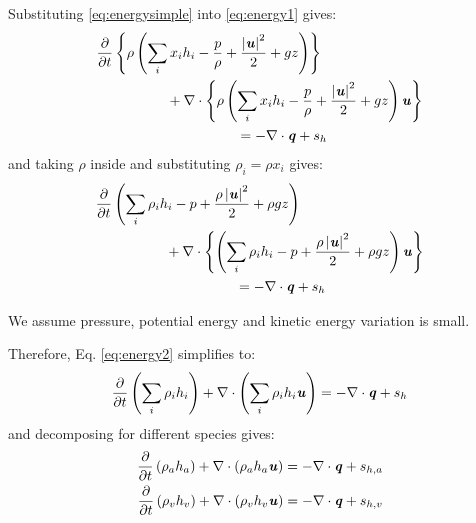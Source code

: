 Substituting \ref{eq:energysimple} into \ref{eq:energy1} gives:
\begin{equation}
\begin{split}
&\frac{\partial }{\partial t} \left\{\rho \left( \sum_i x_i h_i  - \frac{p}{\rho} + \frac{\left| \mvec{u} \right|^2}{2} + gz  \right) \right\}\\
& \hspace{5em} + \nabla  \cdot \left\{ \rho \left(   \sum_i x_i h_i  - \frac{p}{\rho} + \frac{\left| \mvec{u} \right|^2}{2} + gz  \right) \mvec{u} \right\} \\
& \hspace{10em}  =  - \nabla  \cdot \mvec{q} + s_h
\end{split}
\end{equation}
and taking $\rho$ inside and substituting $\rho_i = \rho x_i $ gives:
\begin{equation}
\begin{split}
&\frac{\partial }{\partial t} \left( \sum_i \rho_i h_i  - p + \frac{\rho \left| \mvec{u} \right|^2}{2} + \rho gz  \right) \\
& \hspace{5em} + \nabla  \cdot \left\{ \left(   \sum_i \rho_i h_i  - p + \frac{\rho \left| \mvec{u} \right|^2}{2} + \rho gz  \right) \mvec{u} \right\} \\
& \hspace{10em} =  - \nabla  \cdot \mvec{q} + s_h
\end{split}
\label{eq:energy2}
\end{equation}

\begin{assumption}
	We assume pressure, potential energy and kinetic energy variation is small. 
\end{assumption}	

Therefore, Eq. \ref{eq:energy2} simplifies to:
\begin{equation}
\frac{\partial }{\partial t} \left( \sum_i \rho_i h_i \right) +   \nabla  \cdot \left( \sum_i \rho_i h_i \textbf{\textit{u}}\right) =  - \nabla  \cdot \textbf{\textit{q}} + s_h
\end{equation}
and decomposing for different species gives:
\begin{align}
	\frac{\partial }{\partial t} \left( \rho_a h_a \right) +   \nabla  \cdot \left( \rho_a h_a \textbf{\textit{u}}\right) =  - \nabla  \cdot \textbf{\textit{q}} + s_{h,a} \label{eq:hrhoa}\\
	\frac{\partial }{\partial t} \left( \rho_v h_v \right) +   \nabla  \cdot \left( \rho_v h_v \textbf{\textit{u}}\right) =  - \nabla  \cdot \textbf{\textit{q}} + s_{h,v} \label{eq:hrhov}
\end{align}

